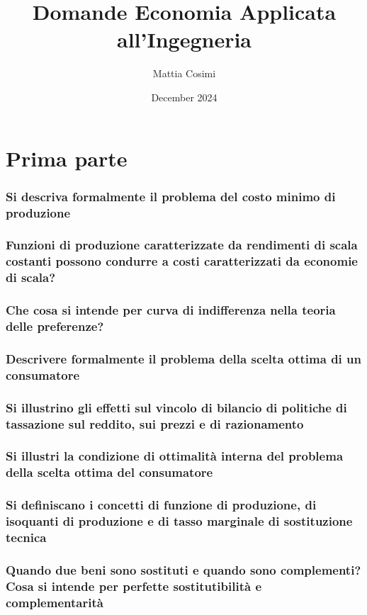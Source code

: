 \documentclass{article}
\title{Domande Economia Applicata all'Ingegneria}
\author{Mattia Cosimi}
\date{December 2024}
\begin{document}
\maketitle

\section{Prima parte}
\subsubsection{Si descriva formalmente il problema del costo minimo di produzione}
\subsubsection{Funzioni di produzione caratterizzate da rendimenti di scala costanti possono condurre a costi caratterizzati da economie di scala? }
\subsubsection{Che cosa si intende per curva di indifferenza nella teoria delle preferenze?}
\subsubsection{Descrivere formalmente il problema della scelta ottima di un consumatore}
\subsubsection{Si illustrino gli effetti sul vincolo di bilancio di politiche di tassazione sul reddito, sui prezzi e di razionamento}
\subsubsection{Si illustri la condizione di ottimalità interna del problema della scelta ottima del consumatore}
\subsubsection{Si definiscano i concetti di funzione di produzione, di isoquanti di produzione e di tasso marginale di sostituzione tecnica}
\subsubsection{Quando due beni sono sostituti e quando sono complementi? Cosa si intende per perfette sostitutibilità e complementarità}
\end{document}
